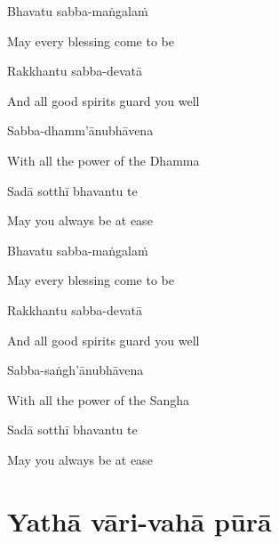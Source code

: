 Bhavatu sabba-maṅgalaṁ

\begin{english}
  May every blessing come to be
\end{english}

Rakkhantu sabba-devatā

\begin{english}
  And all good spirits guard you well
\end{english}

Sabba-dhamm'ānubhāvena

\begin{english}
  With all the power of the Dhamma
\end{english}

Sadā sotthī bhavantu te

\begin{english}
  May you always be at ease
\end{english}

Bhavatu sabba-maṅgalaṁ

\begin{english}
  May every blessing come to be
\end{english}

Rakkhantu sabba-devatā

\begin{english}
  And all good spirits guard you well
\end{english}

Sabba-saṅgh'ānubhāvena

\begin{english}
  With all the power of the Sangha
\end{english}

Sadā sotthī bhavantu te

\begin{english}
  May you always be at ease
\end{english}

\suttaRef{[Trad]}

\ifdigitalversion{}\fi

\clearpage




\section{Yathā vāri-vahā pūrā}
\label{yatha-vari-vaha-pura}

